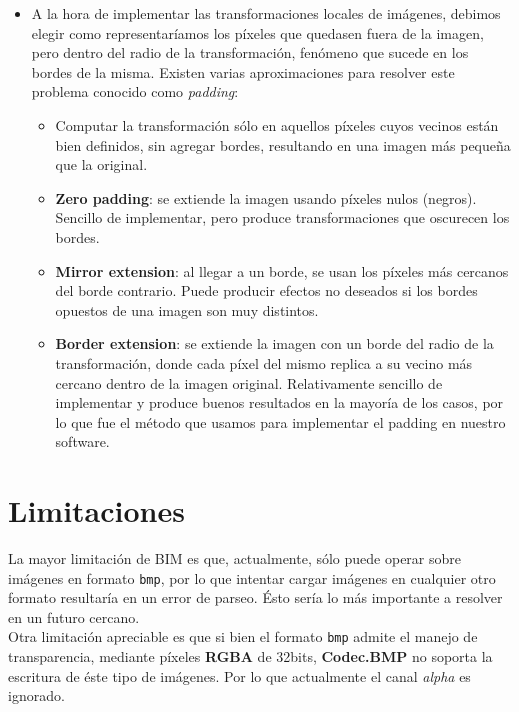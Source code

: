 \documentclass[a4paper, 11pt]{article} %
\begin{document}
\begin{itemize}
		\item A la hora de implementar las transformaciones locales de imágenes, debimos elegir como representaríamos los píxeles que quedasen fuera de la imagen, pero dentro del radio de la transformación, fenómeno que sucede en los bordes de la misma. Existen varias aproximaciones para resolver este problema conocido como \textit{padding}:
			\begin{itemize}
				\item Computar la transformación sólo en aquellos píxeles cuyos vecinos están bien definidos, sin agregar bordes, resultando en una imagen más pequeña que la original.
				\item \textbf{Zero padding}: se extiende la imagen usando píxeles nulos (negros). Sencillo de implementar, pero produce transformaciones que oscurecen los bordes.
				\item \textbf{Mirror extension}: al llegar a un borde, se usan los píxeles más cercanos del borde contrario. Puede producir efectos no deseados si los bordes opuestos de una imagen son muy distintos.
				\item \textbf{Border extension}: se extiende la imagen con un borde del radio de la transformación, donde cada píxel del mismo replica a su vecino más cercano dentro de la imagen original. Relativamente sencillo de implementar y produce buenos resultados en la mayoría de los casos, por lo que fue el método que usamos para implementar el padding en nuestro software.
			\end{itemize}
		
		
	\end{itemize}


\section*{Limitaciones}

La mayor limitación de BIM es que, actualmente, sólo puede operar sobre imágenes en formato \texttt{bmp}, por lo que intentar cargar imágenes en cualquier otro formato resultaría en un error de parseo. Ésto sería lo más importante a resolver en un futuro cercano.\\

\noindent Otra limitación apreciable es que si bien el formato \texttt{bmp} admite el manejo de transparencia, mediante píxeles \textbf{RGBA} de 32bits, \textbf{Codec.BMP} no soporta la escritura de éste tipo de imágenes. Por lo que actualmente el canal \textit{alpha} es ignorado. 
\end{document}

